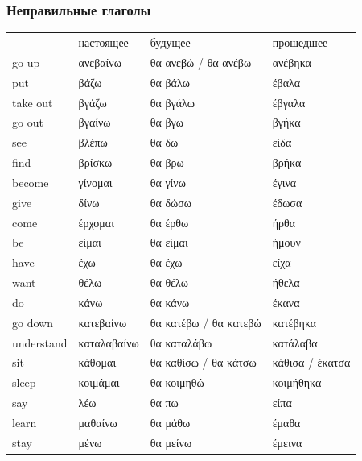 \documentclass[12pt]{article}
\newcommand{\my}[1]{\textcolor{gray!80!white}{#1}}
\newenvironment{page}{\clearpage\normalsize\null\vfill}{\vfill\null}
\begin{document}
    \begin{page}
        \subsubsection*{Неправильные глаголы}
        \scriptsize
        \begin{tabular}{llll}
                  & настоящее & будущее & прошедшее\\
            \my{go up} & ανεβαίνω & θα ανεβώ / θα ανέβω & ανέβηκα \\
            \my{put} & βάζω & θα βάλω & έβαλα \\
            \my{take out} & βγάζω & θα βγάλω & έβγαλα \\
            \my{go out} & βγαίνω & θα βγω & βγήκα \\
            \my{see} & βλέπω & θα δω & είδα \\
            \my{find} & βρίσκω & θα βρω & βρήκα \\
            \my{become} & γίνομαι & θα γίνω & έγινα \\
            \my{give} & δίνω & θα δώσω & έδωσα \\
            \my{come} & έρχομαι & θα έρθω & ήρθα \\
            \my{be} & είμαι & θα είμαι & ήμουν \\
            \my{have} & έχω & θα έχω & είχα \\
            \my{want} & θέλω & θα θέλω & ήθελα \\
            \my{do} & κάνω & θα κάνω & έκανα \\
            \my{go down} & κατεβαίνω & θα κατέβω / θα κατεβώ & κατέβηκα \\
            \my{understand} & καταλαβαίνω & θα καταλάβω & κατάλαβα \\
            \my{sit} & κάθομαι & θα καθίσω / θα κάτσω & κάθισα / έκατσα \\
            \my{sleep} & κοιμάμαι & θα κοιμηθώ & κοιμήθηκα \\
            \my{say} & λέω & θα πω & είπα \\
            \my{learn} & μαθαίνω & θα μάθω & έμαθα \\
            \my{stay} & μένω & θα μείνω & έμεινα \\

\end{tabular}
\end{page}
\end{document}
